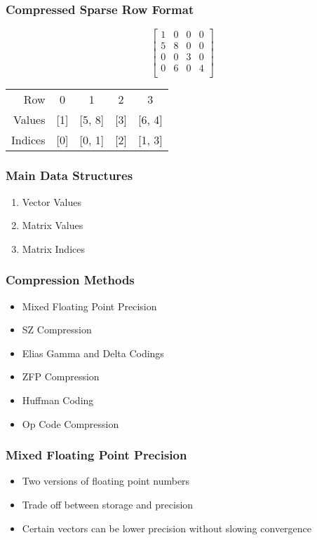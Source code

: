 \documentclass{beamer}
\begin{document}
\begin{frame}
	\frametitle{Compressed Sparse Row Format}
	\centering
	\[
		\begin{bmatrix}
		1 & 0 & 0 & 0 \\
		5 & 8 & 0 & 0 \\
		0 & 0 & 3 & 0 \\
		0 & 6 & 0 & 4 \\
		\end{bmatrix}
	\]
	\begin{tabular}{rcccc}
	Row     & 0 & 1 & 2 & 3 \\
	Values  & [1] & [5, 8] & [3] & [6, 4] \\
	Indices & [0] & [0, 1] & [2] & [1, 3] \\
	\end{tabular}
\end{frame}
\begin{frame}
	\frametitle{Main Data Structures}
	\begin{enumerate}
		\item Vector Values
		\item Matrix Values
		\item Matrix Indices
	\end{enumerate}
\end{frame}

\begin{frame}
	\frametitle{Compression Methods}
	\begin{itemize}
		\item<1-2> Mixed Floating Point Precision
		\item<1-2> SZ Compression
		\item<1-2> Elias Gamma and Delta Codings
		\item<1> ZFP Compression
		\item<1> Huffman Coding
		\item<1> Op Code Compression
	\end{itemize}
\end{frame}

\begin{frame}
	\frametitle{Mixed Floating Point Precision}
	\begin{itemize}
		\item Two versions of floating point numbers
		\item Trade off between storage and precision
		\item Certain vectors can be lower precision without slowing convergence
	\end{itemize}
\end{frame}
\end{document}
